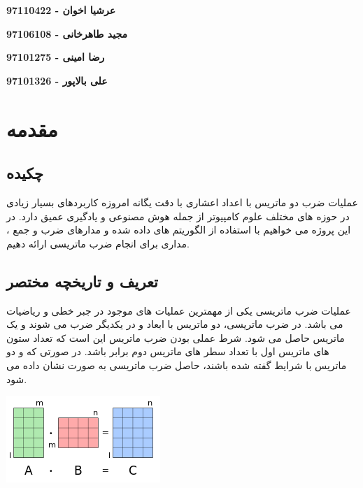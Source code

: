 \documentclass[12pt,titlepage,a4page , tikz , multi,table , svgnames,xcdraw]{article}
\begin{document}
\begin{titlepage}
\begin{center}
        \textbf{{عرشیا اخوان - 97110422 }}
        \vspace{0.05cm}
        
           \textbf{{مجید طاهرخانی - 97106108}}
        \vspace{0.05cm}
        
        
        \textbf{{رضا امینی - 97101275}}
        \vspace{0.05cm}
        
       \textbf{{علی بالاپور - 97101326}}
        \vspace{0.05cm}


\end{center}
\end{titlepage}

\newpage
\pagestyle{fancy}
\fancyhf{}
\fancyfoot{}

\cfoot{\thepage}

\tableofcontents

\newpage

\section{مقدمه}

\subsection{چکیده}
عملیات ضرب دو ماتریس با اعداد اعشاری با دقت یگانه
امروزه کاربردهای بسیار زیادی در حوزه های مختلف علوم کامپیوتر از جمله هوش مصنوعی و یادگیری عمیق دارد. در این پروژه می خواهیم با استفاده از الگوریتم های داده شده و مدارهای ضرب و جمع 
، مداری برای انجام ضرب ماتریسی ارائه دهیم.


\subsection{تعریف و تاریخچه مختصر}
عملیات ضرب ماتریسی یکی از مهمترین عملیات های موجود در جبر خطی و ریاضیات می باشد. در ضرب ماتریسی، دو ماتریس با ابعاد 
و
 در یکدیگر ضرب می شوند و یک ماتریس
 حاصل می شود. شرط عملی بودن ضرب ماتریس این است که تعداد ستون های ماتریس اول با تعداد سطر های ماتریس دوم برابر باشد. در صورتی که 
و
دو ماتریس با شرایط گفته شده باشند، حاصل ضرب ماتریسی به صورت 
نشان داده می شود. \cite{wikipedia}

\begin{center}
\includegraphics[scale=1]
    {Images/Introduction/Matrix_multiplication_overview.png}\\
\end{center}
\end{document}
